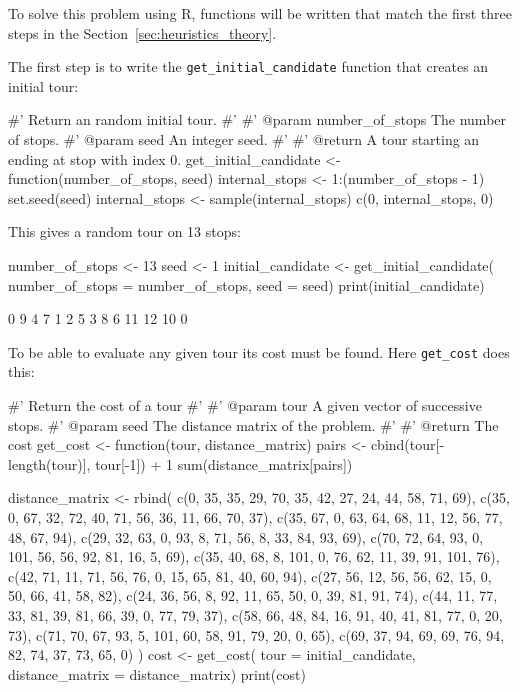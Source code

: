 To solve this problem using R, functions will be written that match the
first three steps in the Section~\ref{sec:heuristics_theory}.

The first step is to write the \texttt{get_initial_candidate}
function that creates an initial tour:

\begin{Rin}
#' Return an random initial tour.
#'
#' @param number_of_stops The number of stops.
#' @param seed An integer seed.
#'
#' @return A tour starting an ending at stop with index 0.
get_initial_candidate <- function(number_of_stops, seed){
  internal_stops <- 1:(number_of_stops - 1)
  set.seed(seed)
  internal_stops <- sample(internal_stops)
  c(0, internal_stops, 0)
}
\end{Rin}

This gives a random tour on 13 stops:

\begin{Rin}
number_of_stops <- 13
seed <- 1
initial_candidate <- get_initial_candidate(
  number_of_stops = number_of_stops,
  seed = seed)
print(initial_candidate)
\end{Rin}

\begin{Rout}
 [1]  0  9  4  7  1  2  5  3  8  6 11 12 10  0
\end{Rout}

To be able to evaluate any given tour its cost must be found. Here
\texttt{get_cost}  does this:

\begin{Rin}
#' Return the cost of a tour
#'
#' @param tour A given vector of successive stops.
#' @param seed The distance matrix of the problem.
#'
#' @return The cost
get_cost <- function(tour, distance_matrix){
  pairs <-  cbind(tour[-length(tour)], tour[-1]) + 1
  sum(distance_matrix[pairs])
}
\end{Rin}

\begin{Rin}
distance_matrix <- rbind(
        c(0, 35, 35, 29, 70, 35, 42, 27, 24, 44, 58, 71, 69),
        c(35, 0, 67, 32, 72, 40, 71, 56, 36, 11, 66, 70, 37),
        c(35, 67, 0, 63, 64, 68, 11, 12, 56, 77, 48, 67, 94),
        c(29, 32, 63, 0, 93, 8, 71, 56, 8, 33, 84, 93, 69),
        c(70, 72, 64, 93, 0, 101, 56, 56, 92, 81, 16, 5, 69),
        c(35, 40, 68, 8, 101, 0, 76, 62, 11, 39, 91, 101, 76),
        c(42, 71, 11, 71, 56, 76, 0, 15, 65, 81, 40, 60, 94),
        c(27, 56, 12, 56, 56, 62, 15, 0, 50, 66, 41, 58, 82),
        c(24, 36, 56, 8, 92, 11, 65, 50, 0, 39, 81, 91, 74),
        c(44, 11, 77, 33, 81, 39, 81, 66, 39, 0, 77, 79, 37),
        c(58, 66, 48, 84, 16, 91, 40, 41, 81, 77, 0, 20, 73),
        c(71, 70, 67, 93, 5, 101, 60, 58, 91, 79, 20, 0, 65),
        c(69, 37, 94, 69, 69, 76, 94, 82, 74, 37, 73, 65, 0)
)
cost <- get_cost(
  tour = initial_candidate,
  distance_matrix = distance_matrix)
print(cost)
\end{Rin}

